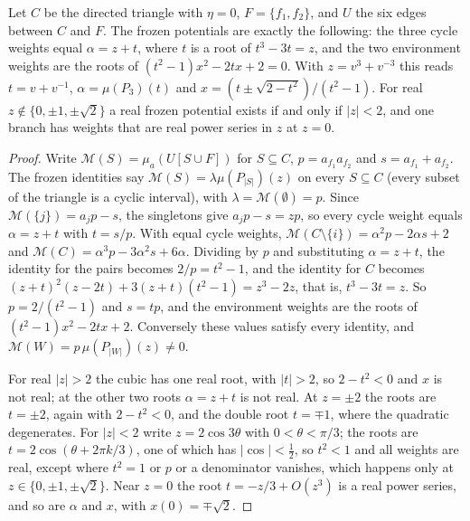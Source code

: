 \documentclass[final]{siamart0516}
\numberwithin{theorem}{section}
\numberwithin{equation}{section}
\theoremstyle{siamnonum}
\theoremstyle{plain}
\newcommand{\Mpot}{\mathcal{M}}           %
\begin{document}
\begin{theorem}\label{thm:triangle-solved}
Let $C$ be the directed triangle with $\eta=0$, $F=\{f_1,f_2\}$, and $U$ the six edges between $C$ and $F$. The frozen potentials are exactly the following: the three cycle weights equal $\alpha=z+t$, where $t$ is a root of $t^{3}-3t=z$, and the two environment weights are the roots of $(t^{2}-1)x^{2}-2tx+2=0$. With $z=v^{3}+v^{-3}$ this reads $t=v+v^{-1}$, $\alpha=\mu(P_3)(t)$ and $x=(t\pm\sqrt{2-t^{2}})/(t^{2}-1)$. For real $z\notin\{0,\pm1,\pm\sqrt2\}$ a real frozen potential exists if and only if $|z|<2$, and one branch has weights that are real power series in $z$ at $z=0$.
\end{theorem}
\begin{proof}
Write $\Mpot(S)=\mu_a(U[S\cup F])$ for $S\subseteq C$, $p=a_{f_1}a_{f_2}$ and $s=a_{f_1}+a_{f_2}$. The frozen identities say $\Mpot(S)=\lambda\mu(P_{|S|})(z)$ on every $S\subseteq C$ (every subset of the triangle is a cyclic interval), with $\lambda=\Mpot(\emptyset)=p$. Since $\Mpot(\{j\})=a_jp-s$, the singletons give $a_jp-s=zp$, so every cycle weight equals $\alpha=z+t$ with $t=s/p$. With equal cycle weights, $\Mpot(C\setminus\{i\})=\alpha^{2}p-2\alpha s+2$ and $\Mpot(C)=\alpha^{3}p-3\alpha^{2}s+6\alpha$. Dividing by $p$ and substituting $\alpha=z+t$, the identity for the pairs becomes $2/p=t^{2}-1$, and the identity for $C$ becomes $(z+t)^{2}(z-2t)+3(z+t)(t^{2}-1)=z^{3}-2z$, that is, $t^{3}-3t=z$. So $p=2/(t^{2}-1)$ and $s=tp$, and the environment weights are the roots of $(t^{2}-1)x^{2}-2tx+2$. Conversely these values satisfy every identity, and $\Mpot(W)=p\,\mu(P_{|W|})(z)\neq0$.

For real $|z|>2$ the cubic has one real root, with $|t|>2$, so $2-t^{2}<0$ and $x$ is not real; at the other two roots $\alpha=z+t$ is not real. At $z=\pm2$ the roots are $t=\pm2$, again with $2-t^2<0$, and the double root $t=\mp1$, where the quadratic degenerates. For $|z|<2$ write $z=2\cos3\theta$ with $0<\theta<\pi/3$; the roots are $t=2\cos(\theta+2\pi k/3)$, one of which has $|\cos|<\frac12$, so $t^{2}<1$ and all weights are real, except where $t^2=1$ or $p$ or a denominator vanishes, which happens only at $z\in\{0,\pm1,\pm\sqrt2\}$. Near $z=0$ the root $t=-z/3+O(z^{3})$ is a real power series, and so are $\alpha$ and $x$, with $x(0)=\mp\sqrt2$.
\end{proof}
\end{document}
